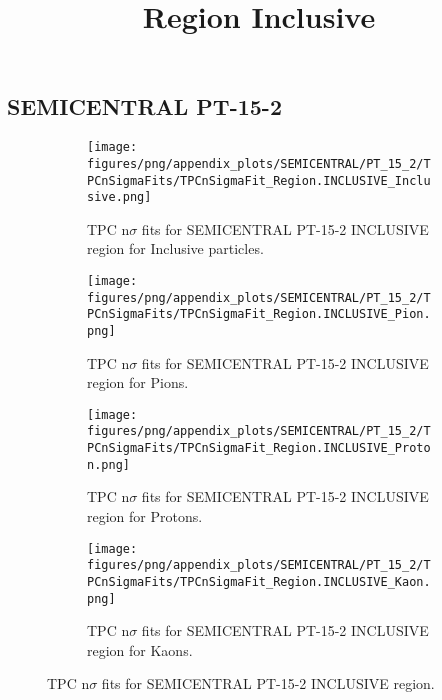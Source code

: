             \subsection{SEMICENTRAL PT-15-2}
            \begin{figure}[H]
                \title{Region Inclusive}
                \begin{subfigure}[b]{0.5\textwidth}
                    \centering
                    \texttt{[image: figures/png/appendix\_plots/SEMICENTRAL/PT\_15\_2/TPCnSigmaFits/TPCnSigmaFit\_Region.INCLUSIVE\_Inclusive.png]}
                    \caption{TPC n$\sigma$ fits for SEMICENTRAL PT-15-2 INCLUSIVE region for Inclusive particles.}
                    \label{fig:appendix_SEMICENTRAL_PT-15-2_INCLUSIVE_Inclusive}
                \end{subfigure}
                \begin{subfigure}[b]{0.5\textwidth}
                    \centering
                    \texttt{[image: figures/png/appendix\_plots/SEMICENTRAL/PT\_15\_2/TPCnSigmaFits/TPCnSigmaFit\_Region.INCLUSIVE\_Pion.png]}
                    \caption{TPC n$\sigma$ fits for SEMICENTRAL PT-15-2 INCLUSIVE region for Pions.}
                    \label{fig:appendix_SEMICENTRAL_PT-15-2_INCLUSIVE_Pion}
                \end{subfigure}
                \begin{subfigure}[b]{0.5\textwidth}
                    \centering
                    \texttt{[image: figures/png/appendix\_plots/SEMICENTRAL/PT\_15\_2/TPCnSigmaFits/TPCnSigmaFit\_Region.INCLUSIVE\_Proton.png]}
                    \caption{TPC n$\sigma$ fits for SEMICENTRAL PT-15-2 INCLUSIVE region for Protons.}
                    \label{fig:appendix_SEMICENTRAL_PT-15-2_INCLUSIVE_Proton}
                \end{subfigure}
                \begin{subfigure}[b]{0.5\textwidth}
                    \centering
                    \texttt{[image: figures/png/appendix\_plots/SEMICENTRAL/PT\_15\_2/TPCnSigmaFits/TPCnSigmaFit\_Region.INCLUSIVE\_Kaon.png]}
                    \caption{TPC n$\sigma$ fits for SEMICENTRAL PT-15-2 INCLUSIVE region for Kaons.}
                    \label{fig:appendix_SEMICENTRAL_PT-15-2_INCLUSIVE_Kaon}
                \end{subfigure}
                \caption{TPC n$\sigma$ fits for SEMICENTRAL PT-15-2 INCLUSIVE region.}
                \label{fig:appendix_SEMICENTRAL_PT-15-2_INCLUSIVE}
            \end{figure}
